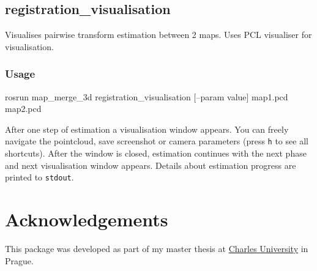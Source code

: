 \subsection{registration\_visualisation}

Visualises pairwise transform estimation between 2 maps. Uses PCL visualiser for visualisation.

\subsubsection{Usage}

\begin{code}
rosrun map_merge_3d registration_visualisation [--param value]
map1.pcd map2.pcd
\end{code}

After one step of estimation a visualisation window appears. You can freely navigate the pointcloud, save screenshot or camera parameters (press \texttt{h} to see all shortcuts). After the window is closed, estimation continues with the next phase and next visualisation window appears. Details about estimation progress are printed to \texttt{stdout}.

\section{Acknowledgements}

This package was developed as part of my master thesis at \href{http://www.mff.cuni.cz/to.en/}{Charles University} in Prague.
